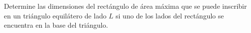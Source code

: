 \item Determine las dimensiones del rectángulo de área máxima que se puede inscribir en un triángulo equilátero de lado $L$ si uno de los lados del rectángulo se encuentra en la base del triángulo.

